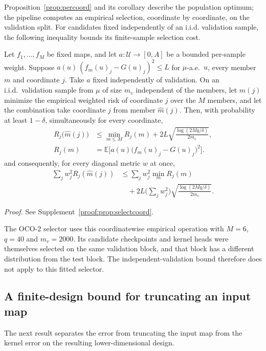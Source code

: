 Proposition~\ref{prop:percoord} and its corollary describe the population
optimum; the pipeline computes an empirical selection, coordinate by
coordinate, on the validation split. For candidates fixed independently of an i.i.d. validation sample, the
following inequality bounds its finite-sample selection cost.

\begin{proposition}\label{prop:selectcoord}
Let $f_1,\dots,f_M$ be fixed maps, and let $a:\mathcal U\to[0,A]$ be a bounded
per-sample weight. Suppose $a(u)\,(f_m(u)_j-G(u)_j)^2\le L$ for
$\mu$-a.e.\ $u$, every member $m$ and coordinate $j$. Take $a$ fixed
independently of validation. On an i.i.d.\ validation sample from $\mu$
of size $m_v$ independent of the members, let $\widehat m(j)$ minimize the
empirical weighted risk of coordinate $j$ over the $M$ members, and let the
combination take coordinate $j$ from member $\widehat m(j)$. Then, with
probability at least $1-\delta$, simultaneously for every coordinate,
\[
\begin{aligned}
R_j\big(\widehat m(j)\big)&\le\min_{m\le M}R_j(m)+2L\sqrt{\frac{\log(2Mq/\delta)}{2m_v}},\\
R_j(m)&=\mathbb E\big[a(u)\big(f_m(u)_j-G(u)_j\big)^2\big].
\end{aligned}
\]
and consequently, for every diagonal metric $w$ at once,
\[
\begin{aligned}
\sum_j w_j^2 R_j(\widehat m(j))
&\le\sum_j w_j^2\min_m R_j(m)\\
&\quad+2L\Big(\sum_j w_j^2\Big)\sqrt{\frac{\log(2Mq/\delta)}{2m_v}}.
\end{aligned}
\]
\end{proposition}
\noindent\emph{Proof.} See Supplement~\ref{proof:prop:selectcoord}.


The OCO-2 selector uses this coordinatewise empirical operation with
$M=6$, $q=40$ and $m_v=2000$. Its candidate checkpoints and kernel heads
were themselves selected on the same validation block, and that block has
a different distribution from the test block. The independent-validation bound therefore does
not apply to this fitted selector.

\subsection{A finite-design bound for truncating an input map}

The next result separates the error from truncating the input map from the
kernel error on the resulting lower-dimensional design.

